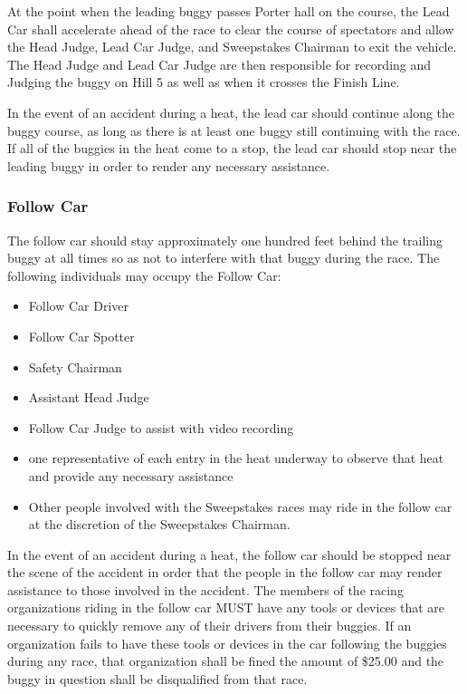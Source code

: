	At the point when the leading buggy passes Porter hall on the course, the Lead Car shall
	accelerate ahead of the race to clear the course of spectators and allow the Head Judge, 
	Lead Car Judge, and Sweepstakes Chairman to exit the vehicle. The Head Judge and Lead Car 
	Judge are then responsible for recording and Judging the buggy on Hill 5 as well as when 
	it crosses the Finish Line. 

	In the event of an accident during a heat, the lead car should continue along
	the buggy course, as long as there is at least one buggy still continuing with
	the race. If all of the buggies in the heat come to a stop, the lead car should
	stop near the leading buggy in order to render any necessary assistance.


\subsubsection{Follow Car}

	The follow car should stay approximately one hundred feet behind the trailing buggy
	at all times so as not to interfere with that buggy during the race.
	The following individuals may occupy the Follow Car:
	
	\begin{itemize}
		
		\item Follow Car Driver
		
		\item Follow Car Spotter
		
		\item Safety Chairman
		
		\item Assistant Head Judge
		
		\item Follow Car Judge to assist with video recording
		
		\item one representative of each entry in the heat underway to observe 
		that heat and provide any necessary assistance
		
		\item Other people involved with the Sweepstakes races may ride in the follow
		car at the discretion of the Sweepstakes Chairman.
		
	\end{itemize}

	In the event of an accident during a heat, the follow car should be stopped
	near the scene of the accident in order that the people in the follow car may
	render assistance to those involved in the accident. The members of the racing
	organizations riding in the follow car MUST have any tools or devices that are
	necessary to quickly remove any of their drivers from their buggies. If an
	organization fails to have these tools or devices in the car following the
	buggies during any race, that organization shall be fined the amount of \$25.00
	and the buggy in question shall be disqualified from that race.


